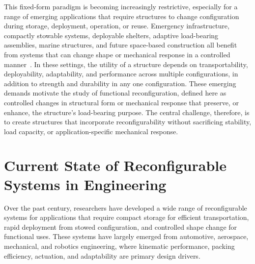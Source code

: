 This fixed-form paradigm is becoming increasingly restrictive, especially for a range of emerging applications that require structures to change configuration during storage, deployment, operation, or reuse. Emergency infrastructure, compactly stowable systems, deployable shelters, adaptive load-bearing assemblies, marine structures, and future space-based construction all benefit from systems that can change shape or mechanical response in a controlled manner~\cite{tosun2023analysis, perez2024deployable, foster1987class, thrall2014accordion, yang2024design, churchill2016dynamically, zirbel2013accommodating, miura2009triangles, seo2025review}. In these settings, the utility of a structure depends on transportability, deployability, adaptability, and performance across multiple configurations, in addition to strength and durability in any one configuration. These emerging demands motivate the study of functional reconfiguration, defined here as controlled changes in structural form or mechanical response that preserve, or enhance, the structure's load-bearing purpose. The central challenge, therefore, is to create structures that incorporate reconfigurability without sacrificing stability, load capacity, or application-specific mechanical response.

\section{Current State of Reconfigurable Systems in Engineering}\label{01-sec-reconfigurable-systems}
Over the past century, researchers have developed a wide range of reconfigurable systems for applications that require compact storage for efficient transportation, rapid deployment from stowed configuration, and controlled shape change for functional uses. These systems have largely emerged from automotive, aerospace, mechanical, and robotics engineering, where kinematic performance, packing efficiency, actuation, and adaptability are primary design drivers.


